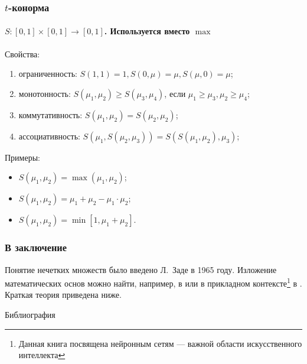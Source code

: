 \begin{frame}
    \frametitle{$t$-конорма}
    \framesubtitle{$S:[0,1]\times[0,1]\to[0,1]$. Используется вместо $\max$}
    
    Свойства:
    \begin{enumerate}
        \item ограниченность: $S(1,1)=1,S(0,\mu)=\mu,S(\mu,0)=\mu$;
        \item монотонность: $S(\mu_1,\mu_2)\geq S(\mu_3,\mu_4)$, если $\mu_1\geq\mu_3, \mu_2\geq\mu_4$;
        \item коммутативность: $S(\mu_1,\mu_2)=S(\mu_2,\mu_2)$;
        \item ассоциативность: $S(\mu_1,S(\mu_2, \mu_3))=S(S(\mu_1,\mu_2),\mu_3)$;
    \end{enumerate}
    
    Примеры:
    \begin{itemize}
        \item $S(\mu_1,\mu_2)=\max(\mu_1,\mu_2)$;
        \item $S(\mu_1,\mu_2)=\mu_1+\mu_2-\mu_1\cdot\mu_2$;
        \item $S(\mu_1,\mu_2)=\min[1,\mu_1+\mu_2]$.
    \end{itemize}
\end{frame}


\appendix


\begin{frame}
    \frametitle{В заключение}
    
    Понятие нечетких множеств было введено Л.~Заде в 1965 году. Изложение  математических основ можно найти, например, в \cite{bib:gorbatovs:discrmath} или в прикладном контексте\footnote{Данная книга посвящена нейронным сетям --- важной области искусственного интеллекта} в \cite{bib:osovsky:neyro}. Краткая теория приведена ниже.    
\end{frame}


\begin{frame}[allowframebreaks]{Библиография}
    
    
\end{frame}


